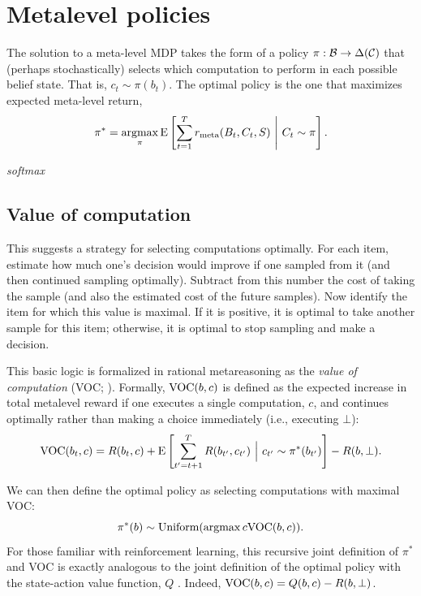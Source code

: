 \section{Metalevel policies}\label{sec:metamdp-policy}

The solution to a meta-level MDP takes the form of a policy $\pi: \mathcal{B} \rightarrow \Delta(\mathcal{C})$ that (perhaps stochastically) selects which computation to perform in each possible belief state. That is, $c_t \sim \pi(b_t)$. The optimal policy is the one that maximizes expected meta-level return,
%
\begin{equation}\label{eq:optimal-policy}
  \pi^* = \operatorname*{argmax}_\pi \operatorname*{E} \left[ 
    \sum_{t=1}^T r_{\text{meta}}(B_t, C_t, S)
   \ \middle\vert\ 
    C_t \sim \pi
   \right].
\end{equation}



 \emph{softmax}

\subsection{Value of computation}

This suggests a strategy for selecting computations optimally. For each item, estimate how much one's decision would improve if one sampled from it (and then continued sampling optimally). Subtract from this number the cost of taking the sample (and also the estimated cost of the future samples). Now identify the item for which this value is maximal. If it is positive, it is optimal to take another sample for this item; otherwise, it is optimal to stop sampling and make a decision.

This basic logic is formalized in rational metareasoning as the \textit{value of computation} (VOC; \citealp{russell1991principles}). Formally, $\text{VOC}(b, c)$ is defined as the expected increase in total metalevel reward if one executes a single computation, $c$, and continues optimally rather than making a choice immediately (i.e., executing $\bot$):
$$
\text{VOC}(b_t, c) = R(b_t, c) + \operatorname*{E} \left[
  \sum_{t'=t+1}^T R(b_{t'}, c_{t'})\ \Big\vert\ c_{t'} \sim \pi^*(b_{t'}) 
\right] - R(b, \bot).
$$

We can then define the optimal policy as selecting computations with maximal VOC:
$$
\pi^*(b) \sim \text{Uniform}(\operatorname*{argmax}{c} \text{VOC}(b, c)).
$$
For those familiar with reinforcement learning, this recursive joint definition of $\pi^*$ and VOC is exactly analogous to the joint definition of the optimal policy with the state-action value function, $Q$ \citep{sutton2018reinforcement}. Indeed, $\text{VOC}(b, c) = Q(b, c) - R(b, \bot)$. 

